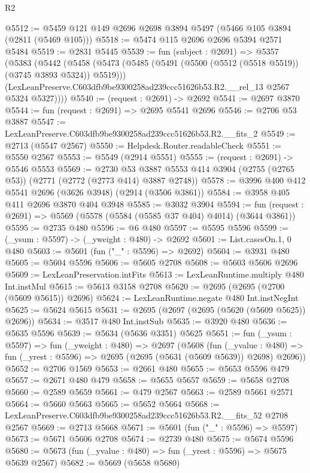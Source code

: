 \begin{lexlean}{R2}
\begin{coremodule}
@5512 := @5459 @121 @149 @2696 @2698 @3894 @5497 (@5466 @105 @3894 (@2811 (@5469 @105)))
@5518 := @5474 @115 @2696 @2696 @5394 @2571 @5484
@5519 := @2831 @5445
@5539 := fun (subject : @2691) =>
  @5357
    (@5383
      (@5442
        (@5458
          (@5473 (@5485 (@5491 (@5500 (@5512 (@5518 @5519)) (@3745 @3893 @5324)) @5519)))
          (LexLeanPreserve.C603dfb9be9300258ad239ccc51626b53.R2.__rel_13 @2567 @5324 @5327))))
@5540 := (request : @2691) -> @2692
@5541 := @2697 @3870
@5544 := fun (request : @2691) => @2695 @5541 @2696
@5546 := @2706 @53 @3887
@5547 := LexLeanPreserve.C603dfb9be9300258ad239ccc51626b53.R2.__fits_2
@5549 := @2713 (@5547 @2567)
@5550 := Helpdesk.Router.readableCheck
@5551 := @5550 @2567
@5553 := @5549 (@2914 @5551)
@5555 := (request : @2691) -> @5546 @5553
@5569 := @2730
    @53
    @3887
    @5553
    @414
    @3904
    (@2755 (@2765 @53))
    (@2771 (@2772 (@2773 @414) @3887 @2748))
@5578 := @3996 @400 @412 @5541 @2696 (@3626 @3948) (@2914 (@3506 @3861))
@5584 := @3958 @405 @411 @2696 @3870 @404 @3948
@5585 := @3032 @3904
@5594 := fun (request : @2691) => @5569 (@5578 (@5584 (@5585 @37 @404) @4014) (@3644 @3861))
@5595 := @2735 @480
@5596 := @6 @480
@5597 := @5595 @5596
@5599 := (_ysum : @5597) -> (_yweight : @480) -> @2692
@5601 := List.casesOn.{1, 0} @480
@5603 := @5601 (fun ("_" : @5596) => @2692)
@5604 := @3931 @480
@5605 := @5604 @5596
@5606 := @5605 @2708
@5608 := @5603 @5606 @2696
@5609 := LexLeanPreservation.intFits
@5613 := LexLeanRuntime.multiply @480 Int.instMul
@5615 := @5613 @3158 @2708
@5620 := @2695 (@2695 (@2700 (@5609 @5615)) @2696)
@5624 := LexLeanRuntime.negate @480 Int.instNegInt
@5625 := @5624 @5615
@5631 := @2695 (@2697 (@2695 (@5620 (@5609 @5625)) @2696))
@5634 := @3517 @480 Int.instSub
@5635 := @3920 @480
@5636 := @5635 @5596
@5639 := @5634 (@5636 @3351) @5625
@5651 := fun (_ysum : @5597) =>
  fun (_yweight : @480) =>
  @2697
    (@5608
      (fun (_yvalue : @480) =>
      fun (_yrest : @5596) => @2695 (@2695 (@5631 (@5609 @5639)) @2698) @2696))
@5652 := @2706 @1569
@5653 := @2661 @480
@5655 := @5653 @5596 @479
@5657 := @2671 @480 @479
@5658 := @5655 @5657
@5659 := @5658 @2708
@5660 := @2589 @5659
@5661 := @479 @2567
@5663 := @2589 @5661 @2571
@5664 := @5660 @5663
@5665 := @5652 @5664
@5668 := LexLeanPreserve.C603dfb9be9300258ad239ccc51626b53.R2.__fits_52 @2708 @2567
@5669 := @2713 @5668
@5671 := @5601 (fun ("_" : @5596) => @5597)
@5673 := @5671 @5606 @2708
@5674 := @2739 @480
@5675 := @5674 @5596
@5680 := @5673 (fun (_yvalue : @480) => fun (_yrest : @5596) => @5675 @5639 @2567)
@5682 := @5669 (@5658 @5680)

\end{coremodule}
\end{lexlean}
